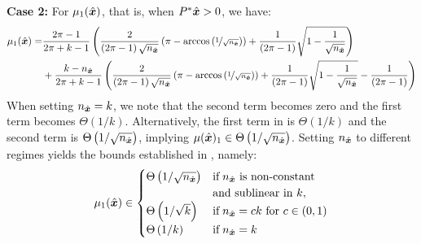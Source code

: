 \textbf{Case 2:} For $\mu_1(\hat{\boldsymbol{x}})$, that is, when $P^*\hat{\boldsymbol{x}}>0$, we have:
\begin{align}
\label{eq:mu_1}
    \mu_1(\hat{\boldsymbol{x}}) = &\frac{2\pi-1}{2\pi+k-1}\left(\frac{2}{\left(2\pi-1\right)\sqrt{n_{\hat{\boldsymbol{x}}}}}\left(\pi-\arccos\left(\nicefrac{1}{\sqrt{n_{\hat{\boldsymbol{x}}}}}\right)\right)+\frac{1}{\left(2\pi-1\right)}\sqrt{1-\frac{1}{\sqrt{n_{\hat{\boldsymbol{x}}}}}}\right)\nonumber\\ &+ \frac{k-n_{\hat{\boldsymbol{x}}}}{2\pi+k-1}\left(\frac{2}{\left(2\pi-1\right)\sqrt{n_{\hat{\boldsymbol{x}}}}}\left(\pi-\arccos\left(\nicefrac{1}{\sqrt{n_{\hat{\boldsymbol{x}}}}}\right)\right)+\frac{1}{\left(2\pi-1\right)}\sqrt{1-\frac{1}{\sqrt{n_{\hat{\boldsymbol{x}}}}}}-\frac{1}{\left(2\pi-1\right)}\right)
\end{align}
When setting $n_{\hat{\boldsymbol{x}}}=k$, we note that the second term becomes zero and the first term becomes $\Theta\left(1/k\right)$.
Alternatively, the first term in  is $\Theta\left(1/k\right)$ and the second term is $\Theta\left(1/\sqrt{n_{\hat{\boldsymbol{x}}}}\right)$, implying $\mu(\hat{\boldsymbol{x}})_1 \in \Theta\left(1/\sqrt{n_{\hat{\boldsymbol{x}}}}\right)$. 
Setting $n_{\hat{\boldsymbol{x}}}$ to different regimes yields the bounds established in , namely:
\begin{equation*}
\mu_1(\hat{\boldsymbol{x}}) \in \begin{cases}
            \Theta\left(1/\sqrt{n_{\hat{\boldsymbol{x}}}}\right) & \text{if}\; n_{\hat{\boldsymbol{x}}} \text{ is non-constant}\\ &\text{and sublinear in } k,\\
            \Theta\left(1/\sqrt{k}\right) & \text{if}\; n_{\hat{\boldsymbol{x}}} = ck \text{ for } c\in(0,1) \\ 
            \Theta\left(1/k\right) & \text{if}\; n_{\hat{\boldsymbol{x}}}=k
        \end{cases}
\end{equation*}

